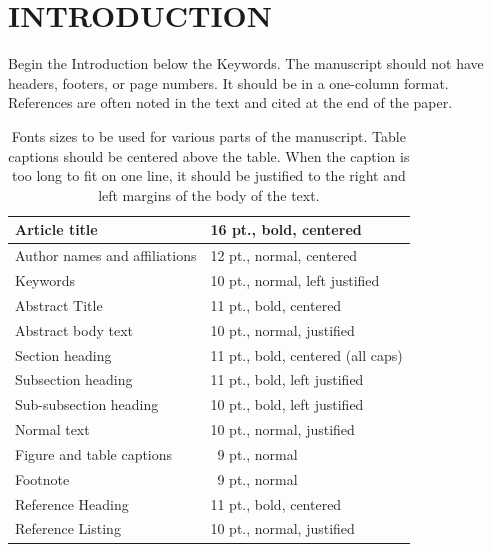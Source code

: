 \section{INTRODUCTION}
\label{sec:intro}  %

Begin the Introduction below the Keywords. The manuscript should not have headers, footers, or page numbers. It should be in a one-column format. References are often noted in the text and cited at the end of the paper.

\begin{table}[ht]
\caption{Fonts sizes to be used for various parts of the manuscript.  Table captions should be centered above the table.  When the caption is too long to fit on one line, it should be justified to the right and left margins of the body of the text.}
\label{tab:fonts}
\begin{center}
\begin{tabular}{|l|l|} %
\hline
\rule[-1ex]{0pt}{3.5ex}  Article title & 16 pt., bold, centered  \\
\hline
\rule[-1ex]{0pt}{3.5ex}  Author names and affiliations & 12 pt., normal, centered   \\
\hline
\rule[-1ex]{0pt}{3.5ex}  Keywords & 10 pt., normal, left justified   \\
\hline
\rule[-1ex]{0pt}{3.5ex}  Abstract Title & 11 pt., bold, centered   \\
\hline
\rule[-1ex]{0pt}{3.5ex}  Abstract body text & 10 pt., normal, justified   \\
\hline
\rule[-1ex]{0pt}{3.5ex}  Section heading & 11 pt., bold, centered (all caps)  \\
\hline
\rule[-1ex]{0pt}{3.5ex}  Subsection heading & 11 pt., bold, left justified  \\
\hline
\rule[-1ex]{0pt}{3.5ex}  Sub-subsection heading & 10 pt., bold, left justified  \\
\hline
\rule[-1ex]{0pt}{3.5ex}  Normal text & 10 pt., normal, justified  \\
\hline
\rule[-1ex]{0pt}{3.5ex}  Figure and table captions & \, 9 pt., normal \\
\hline
\rule[-1ex]{0pt}{3.5ex}  Footnote & \, 9 pt., normal \\
\hline
\rule[-1ex]{0pt}{3.5ex}  Reference Heading & 11 pt., bold, centered   \\
\hline
\rule[-1ex]{0pt}{3.5ex}  Reference Listing & 10 pt., normal, justified   \\
\hline
\end{tabular}
\end{center}
\end{table}

